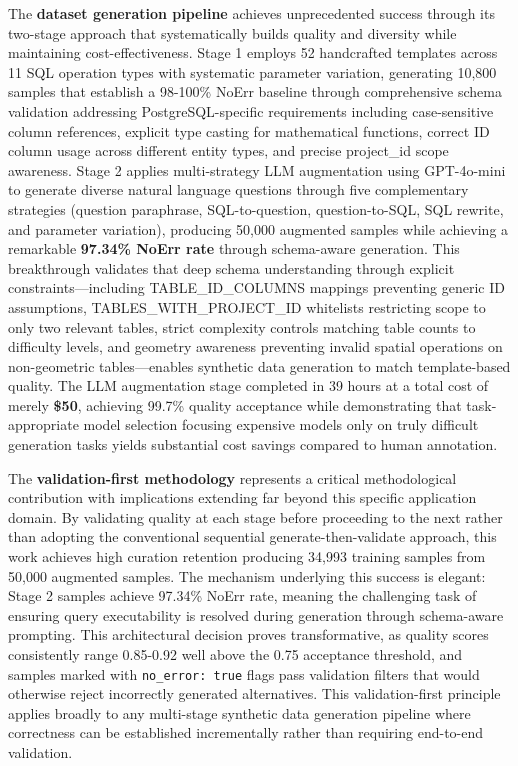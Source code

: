 The \textbf{dataset generation pipeline} achieves unprecedented success through its two-stage approach that systematically builds quality and diversity while maintaining cost-effectiveness. Stage 1 employs 52 handcrafted templates across 11 SQL operation types with systematic parameter variation, generating 10,800 samples that establish a 98-100\% NoErr baseline through comprehensive schema validation addressing PostgreSQL-specific requirements including case-sensitive column references, explicit type casting for mathematical functions, correct ID column usage across different entity types, and precise project\_id scope awareness. Stage 2 applies multi-strategy LLM augmentation using GPT-4o-mini to generate diverse natural language questions through five complementary strategies (question paraphrase, SQL-to-question, question-to-SQL, SQL rewrite, and parameter variation), producing 50,000 augmented samples while achieving a remarkable \textbf{97.34\% NoErr rate} through schema-aware generation. This breakthrough validates that deep schema understanding through explicit constraints---including TABLE\_ID\_COLUMNS mappings preventing generic ID assumptions, TABLES\_WITH\_PROJECT\_ID whitelists restricting scope to only two relevant tables, strict complexity controls matching table counts to difficulty levels, and geometry awareness preventing invalid spatial operations on non-geometric tables---enables synthetic data generation to match template-based quality. The LLM augmentation stage completed in 39 hours at a total cost of merely \textbf{\$50}, achieving 99.7\% quality acceptance while demonstrating that task-appropriate model selection focusing expensive models only on truly difficult generation tasks yields substantial cost savings compared to human annotation.

The \textbf{validation-first methodology} represents a critical methodological contribution with implications extending far beyond this specific application domain. By validating quality at each stage before proceeding to the next rather than adopting the conventional sequential generate-then-validate approach, this work achieves high curation retention producing 34,993 training samples from 50,000 augmented samples. The mechanism underlying this success is elegant: Stage 2 samples achieve 97.34\% NoErr rate, meaning the challenging task of ensuring query executability is resolved during generation through schema-aware prompting. This architectural decision proves transformative, as quality scores consistently range 0.85-0.92 well above the 0.75 acceptance threshold, and samples marked with \texttt{no\_error: true} flags pass validation filters that would otherwise reject incorrectly generated alternatives. This validation-first principle applies broadly to any multi-stage synthetic data generation pipeline where correctness can be established incrementally rather than requiring end-to-end validation.


